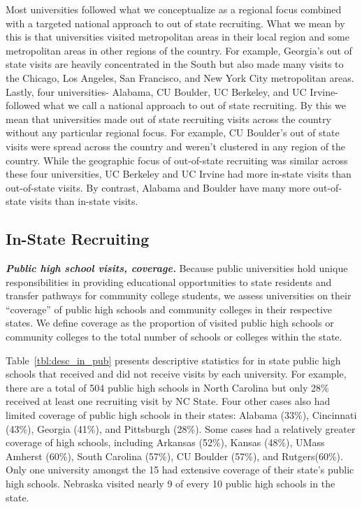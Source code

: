 \documentclass[twoside]{article}
\begin{document}

Most universities followed what we conceptualize as a regional focus combined with a targeted national approach to out of state recruiting. What we mean by this is that universities visited metropolitan areas in their local region and some metropolitan areas in other regions of the country. For example, Georgia's out of state visits are heavily concentrated in the South but also made many visits to the Chicago, Los Angeles, San Francisco, and New York City metropolitan areas. Lastly, four universities- Alabama, CU Boulder, UC Berkeley, and UC Irvine- followed what we call a national approach to out of state recruiting. By this we mean that universities made out of state recruiting visits across the country without any particular regional focus. For example, CU Boulder's out of state visits were spread across the country and weren't clustered in any region of the country.  While the geographic focus of out-of-state recruiting was similar across these four universities, UC Berkeley and UC Irvine had more in-state visits than out-of-state visits. By contrast, Alabama and Boulder have many more out-of-state visits than in-state visits.

\subsection*{In-State Recruiting}
\textbf{\textit{Public high school visits, coverage.}} Because public universities hold unique responsibilities in providing educational opportunities to state residents and transfer pathways for community college students, we assess universities on their “coverage” of public high schools and community colleges in their respective states. We define coverage as the proportion of visited public high schools or community colleges to the total number of schools or colleges within the state.

Table~\ref{tbl:desc_in_pub} presents descriptive statistics for in state public high schools that received and did not receive visits by each university. For example, there are a total of 504 public high schools in North Carolina but only 28\% received at least one recruiting visit by NC State.  Four other cases also had limited coverage of public high schools in their states: Alabama (33\%), Cincinnati (43\%), Georgia (41\%), and Pittsburgh (28\%). Some cases had a relatively greater coverage of high schools, including Arkansas (52\%), Kansas (48\%), UMass Amherst (60\%), South Carolina (57\%), CU Boulder (57\%), and Rutgers(60\%). Only one university amongst the 15 had extensive coverage of their state’s public high schools. Nebraska visited nearly 9 of every 10 public high schools in the state.
\end{document}

